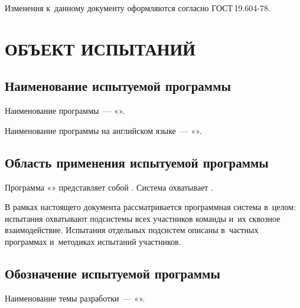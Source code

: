 \documentclass[12pt,a4paper]{extarticle}
\begin{document}
Изменения к~данному документу оформляются согласно ГОСТ\,19.604-78\cite{gost19604}.

\clearpage

\hypersetup{linkcolor=black}
\tableofcontents
\hypersetup{linkcolor=blue}
\thispagestyle{fancy}
\clearpage

\section{ОБЪЕКТ ИСПЫТАНИЙ}

\subsection{Наименование испытуемой программы}

Наименование программы~--- «\projectname».

Наименование программы на английском языке~--- «\hseProjectNameEn».

\subsection{Область применения испытуемой программы}


Программа «\projectname» представляет собой . Система охватывает .

В рамках настоящего документа рассматривается программная система в~целом: испытания охватывают подсистемы всех участников команды и~их сквозное взаимодействие. Испытания отдельных подсистем описаны в~частных программах и~методиках испытаний участников.

\subsection{Обозначение испытуемой программы}

Наименование темы разработки~--- «\projectname».
\end{document}
